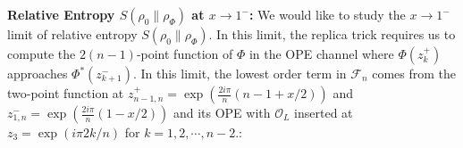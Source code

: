 \documentclass[11pt]{article}
\newcommand{\ep}{\epsilon}
\newcommand{\mO}{\mathcal{O}}
\newcommand{\nn}{\nonumber}
\newcommand{\lb}{\left(}
\newcommand{\rb}{\right)}
\newcommand{\NL}[1]{\textcolor{blue}{#1}}
\newcommand{\JM}[1]{\textcolor{orange}{#1}}
\begin{document}
{\bf Relative Entropy $S(\rho_0\|\rho_\Phi)$ at $x\to 1^-$:}
We would like to study the $x\to 1^-$ limit of relative entropy $S(\rho_0\|\rho_\Phi)$. In this limit, the replica trick requires us to compute the $2(n-1)$-point function of $\Phi$ in the OPE channel where $\Phi(z_k^+)$ approaches $\Phi^*(z_{k+1}^-)$. In this limit, the lowest order term in $\mathcal{F}_n$ comes from the two-point function at $z_{n-1,n}^+=\exp(\frac{2i\pi}{n}(n-1+x/2))$ and $z_{1,n}^-=\exp(\frac{2i\pi}{n}(1-x/2))$ and its OPE with $\mO_L$ inserted at $z_3 = \exp (i\pi 2k/n)$ for $k = 1,2, \cdots, n-2.$:
\end{document}
